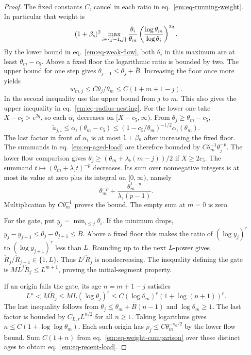 \documentclass[11pt,letterpaper,reqno]{amsart}
\numberwithin{equation}{section}
\renewcommand{\eqref}[1]{\textup{eq.~\ref{#1}}}
\theoremstyle{definition}
\theoremstyle{remark}
\begin{document}
\begin{proof}
The fixed constants $C_\iota$ cancel in each ratio in
\eqref{em:eq-running-weight}. In particular that weight is
\[
 (1+\beta_{\rm s})^2\max_{i\in\{j-1,j\}}
   \frac{\theta_i}{\theta_m}
        \left(\frac{\log\theta_m}{\log\theta_i}\right)^{2q}.
\]
By the lower bound in \eqref{em:eq-weak-flow}, both $\theta_i$
in this maximum are at least $\theta_m-c_5$. Above a fixed floor
the logarithmic ratio is bounded by two. The upper bound for one
step gives $\theta_{j-1}\le\theta_j+\bar B$. Increasing the floor
once more yields
\begin{equation}\label{em:eq-weight-comparison}
    w_{m,j}\le C\theta_j/\theta_m\le C(1+m+1-j).
\end{equation}
In the second inequality use the upper bound from $j$ to $m$.
This also gives the upper inequality in \eqref{em:eq-radius-nesting}.
For the lower one take $X-c_5>e^{2q}$, so each $\alpha_\iota$
decreases on $[X-c_5,\infty)$. From $\theta_j\ge\theta_m-c_5$,
\[
 \check a_{j,\iota}\le \alpha_\iota(\theta_m-c_5)
     \le (1-c_5/\theta_m)^{-1/2}\alpha_\iota(\theta_m).
\]
The last factor in front of $\alpha_\iota$ is at most
$1+\beta_{\rm s}$ after increasing the fixed floor.
The summands in \eqref{em:eq-aged-load} are therefore bounded by
$C\theta_m^{-1}\theta_j^{-p}$. The lower flow comparison gives
$\theta_j\ge (\theta_m+\lambda_\flat(m-j))/2$ if $X\ge2c_5$.
The summand $t\mapsto(\theta_m+\lambda_\flat t)^{-p}$ decreases.
Its sum over nonnegative integers is at most its value at zero
plus its integral on $[0,\infty)$, namely
\[
   \theta_m^{-p}+
                \frac{\theta_m^{1-p}}{\lambda_\flat(p-1)}.
\]
Multiplication by $C\theta_m^{-1}$ proves the bound. The empty
sum at $m=0$ is zero.

For the gate, put $y_j=\min_{i\le j}\theta_i$. If the minimum
drops, $y_j-y_{j+1}\le\theta_j-\theta_{j+1}\le\bar B$.
Above a fixed floor this makes the ratio of
$(\log y_j)^r$ to $(\log y_{j+1})^r$ less than $L$. Rounding up to
the next $L$-power gives $\check R_j/\check R_{j+1}\in\{1,L\}$.
Thus $L^j\check R_j$ is nondecreasing. The inequality defining the
gate is $M L^j\check R_j\le L^{m+1}$, proving the initial-segment
property.

If an origin fails the gate, its age $n=m+1-j$ satisfies
\[
  L^n<M\check R_j\le ML(\log\theta_j)^r
     \le C(\log\theta_m)^r(1+\log(n+1))^r.
\]
The last inequality follows from
$\theta_j\le\theta_m+\bar B(n-1)$ and $\log\theta_m\ge1$.
The last factor is bounded by $C_{L,r}L^{n/2}$ for all $n\ge1$.
Taking logarithms gives $n\le C(1+\log\log\theta_m)$. Each such
origin has $\rho_j\le C\theta_m^{-\kappa_0/2}$ by the lower flow
bound. Sum $C(1+n)$ from \eqref{em:eq-weight-comparison} over these
distinct ages to obtain \eqref{em:eq-recent-load}.
\end{proof}
\end{document}

